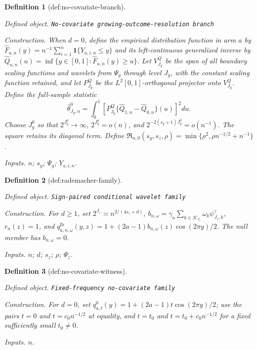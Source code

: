 \documentclass{article}
\newtheorem{definition}{Definition}
\begin{document}
\begin{definition}[def:no-covariate-branch]\label{def:no-covariate-branch}
\par\smallskip\noindent\emph{Defined object.} \texttt{No-\allowbreak{}covariate growing-\allowbreak{}outcome-\allowbreak{}resolution branch}
\par\smallskip\noindent\emph{Construction.} When \(d=0\), define the empirical distribution function in arm \(a\) by \(\widehat F_{a,n}(y)=n^{-1}\sum_{i=1}^n\mathbf 1\{Y_{a,i,n}\le y\}\) and its left-continuous generalized inverse by \(\widehat Q_{a,n}(u)=\inf\{y\in[0,1]:\widehat F_{a,n}(y)\ge u\}\). Let \(V^Q_{J_y}\) be the span of all boundary scaling functions and wavelets from \(\Psi_y\) through level \(J_y\), with the constant scaling function retained, and let \(P^Q_{J_y}\) be the \(L^2[0,1]\)-orthogonal projector onto \(V^Q_{J_y}\). Define the full-sample statistic
\[
\widehat\theta^0_{J_y,n}=\int_0^1\left[P^Q_{J_y}\{\widehat Q_{1,n}-\widehat Q_{0,n}\}(u)\right]^2du .
\]
Choose \(J_y^0\) so that \(2^{J_y^0}\to\infty\), \(2^{J_y^0}=o(n)\), and \(2^{-2(s_y+1)J_y^0}=o(n^{-1})\). The square retains its diagonal term. Define \(\mathfrak R_{n,0}(s_y,s_z,\rho)=\min\{\rho^2,\rho n^{-1/2}+n^{-1}\}\).
\par\smallskip\noindent\emph{Inputs.} \(n\); \(s_y\); \(\Psi_y\); \(Y_{a,i,n}\).
\end{definition}

\begin{definition}[def:rademacher-family]\label{def:rademacher-family}
\par\smallskip\noindent\emph{Defined object.} \texttt{Sign-\allowbreak{}paired conditional wavelet family}
\par\smallskip\noindent\emph{Construction.} For \(d\ge1\), set \(2^{J_z}\asymp n^{2/(4s_z+d)}\), \(b_{n,\omega}=\gamma_n\sum_{k\in\mathcal K_{J_z}}\omega_k\psi^z_{J_z,k}\), \(r_n(z)=1\), and \(q_{a,n,\omega}^{\mathrm{lb}}(y,z)=1+(2a-1)b_{n,\omega}(z)\cos(2\pi y)/2\). The null member has \(b_{n,\omega}=0\).
\par\smallskip\noindent\emph{Inputs.} \(n\); \(d\); \(s_z\); \(\rho\); \(\Psi_z\).
\end{definition}

\begin{definition}[def:no-covariate-witness]\label{def:no-covariate-witness}
\par\smallskip\noindent\emph{Defined object.} \texttt{Fixed-\allowbreak{}frequency no-\allowbreak{}covariate family}
\par\smallskip\noindent\emph{Construction.} For \(d=0\), set \(q_{a,t}^{0}(y)=1+(2a-1)t\cos(2\pi y)/2\); use the pairs \(t=0\) and \(t=c_0n^{-1/2}\) at equality, and \(t=t_0\) and \(t=t_0+c_0n^{-1/2}\) for a fixed sufficiently small \(t_0\ne0\).
\par\smallskip\noindent\emph{Inputs.} \(n\).
\end{definition}
\end{document}
